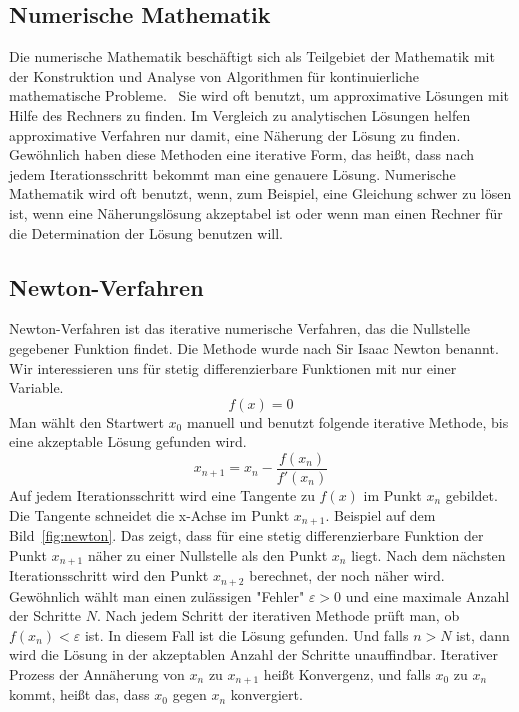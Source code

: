 \documentclass[a4paper,12pt]{llncs}
\numberwithin{equation}{section}
\begin{document}
\subsection{Numerische Mathematik}
Die numerische Mathematik beschäftigt sich als Teilgebiet der Mathematik mit der Konstruktion und Analyse von Algorithmen für kontinuierliche mathematische Probleme.~\cite{nummath}
Sie wird oft benutzt, um approximative Lösungen mit Hilfe des Rechners zu finden.
Im Vergleich zu analytischen Lösungen helfen approximative Verfahren nur damit, eine Näherung der Lösung zu finden.
Gewöhnlich haben diese Methoden eine iterative Form, das heißt, dass nach jedem Iterationsschritt bekommt man eine genauere Lösung.
Numerische Mathematik wird oft benutzt, wenn, zum Beispiel, eine Gleichung schwer zu lösen ist, wenn eine Näherungslösung akzeptabel ist oder wenn man einen Rechner für die Determination der Lösung benutzen will.

\subsection{Newton-Verfahren}
Newton-Verfahren ist das iterative numerische Verfahren, das die Nullstelle gegebener Funktion findet.
Die Methode wurde nach Sir Isaac Newton benannt. \\
Wir interessieren uns für stetig differenzierbare Funktionen mit nur einer Variable.
\[
f(x) = 0
\] 
Man wählt den Startwert $x_0$ manuell und benutzt folgende iterative Methode, bis eine akzeptable Lösung gefunden wird.
\[
x_{n+1} = x_n - \frac{f(x_n)}{f'(x_n)}
\] 
Auf jedem Iterationsschritt wird eine Tangente zu $f(x)$ im Punkt $x_n$ gebildet.
Die Tangente schneidet die x-Achse im Punkt $x_{n+1}$. 
Beispiel auf dem Bild~\ref{fig:newton}.
Das zeigt, dass für eine stetig differenzierbare Funktion der Punkt $x_{n+1}$ näher zu einer Nullstelle als den Punkt $x_n$ liegt.
Nach dem nächsten Iterationsschritt wird den Punkt $x_{n+2}$ berechnet, der noch näher wird.\\
Gewöhnlich wählt man einen zulässigen "Fehler" $\varepsilon>0$ und eine maximale Anzahl der Schritte $N$.
Nach jedem Schritt der iterativen Methode prüft man, ob $f(x_n)  < \varepsilon$ ist. 
In diesem Fall ist die Lösung gefunden.
Und falls $n > N$ ist, dann wird die Lösung in der akzeptablen Anzahl der Schritte unauffindbar. 
Iterativer Prozess der Annäherung von $x_n$ zu $x_{n+1}$ heißt Konvergenz, und falls $x_0$ zu $x_n$ kommt, heißt das, dass $x_0$ gegen $x_n$ konvergiert.
\end{document}
